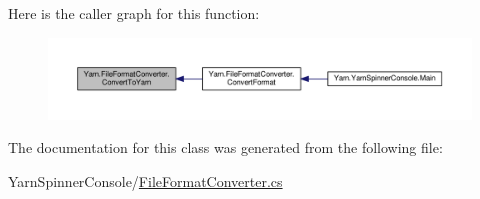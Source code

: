 Here is the caller graph for this function\-:
\nopagebreak
\begin{figure}[H]
\begin{center}
\leavevmode
\includegraphics[width=350pt]{a00100_a1e6cd39b0c813f21da278367dcff76d2_icgraph}
\end{center}
\end{figure}




The documentation for this class was generated from the following file\-:\begin{DoxyCompactItemize}
\item 
Yarn\-Spinner\-Console/\hyperlink{a00298}{File\-Format\-Converter.\-cs}\end{DoxyCompactItemize}
